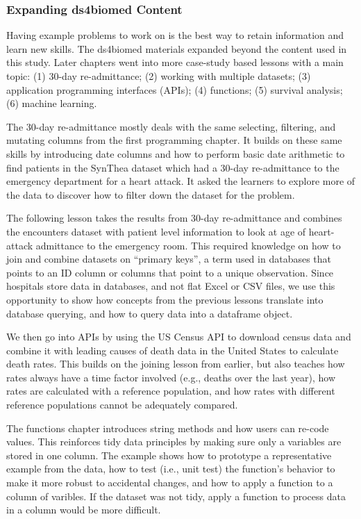 \documentclass[030-workshop.tex]{subfiles}
\begin{document}
    \subsubsection{Expanding ds4biomed Content}

        Having example problems to work on is the best way to retain information and learn new skills.
        The ds4biomed materials expanded beyond the content used in this study.
        Later chapters went into more case-study based lessons with a main topic:
        (1) 30-day re-admittance;
        (2) working with multiple datasets;
        (3) application programming interfaces (APIs);
        (4) functions;
        (5) survival analysis;
        (6) machine learning.

        The 30-day re-admittance mostly deals with the same selecting, filtering, and mutating columns
        from the first programming chapter.
        It builds on these same skills by introducing date columns and how to perform basic date arithmetic
        to find patients in the SynThea dataset which had a 30-day re-admittance to the emergency department for a heart attack.
        It asked the learners to explore more of the data to discover how to filter down the dataset for the problem.

        The following lesson takes the results from 30-day re-admittance and combines the encounters dataset with
        patient level information to look at age of heart-attack admittance to the emergency room.
        This required knowledge on how to join and combine datasets on ``primary keys'',
        a term used in databases that points to an ID column or columns that point to a unique observation.
        Since hospitals store data in databases, and not flat Excel or CSV files,
        we use this opportunity to show how concepts from the previous lessons translate into database querying,
        and how to query data into a dataframe object.

        We then go into APIs by using the US Census API to download census data and combine it with
        leading causes of death data in the United States to calculate death rates.
        This builds on the joining lesson from earlier,
        but also teaches how rates always have a time factor involved (e.g., deaths over the last year),
        how rates are calculated with a reference population,
        and how rates with different reference populations cannot be adequately compared.

        The functions chapter introduces string methods and how users can re-code values.
        This reinforces tidy data principles by making sure only a variables are stored in one column.
        The example shows how to prototype a representative example from the data,
        how to test (i.e., unit test) the function's behavior to make it more robust to accidental changes,
        and how to apply a function to a column of varibles.
        If the dataset was not tidy,
        apply a function to process data in a column would be more difficult.
\end{document}
